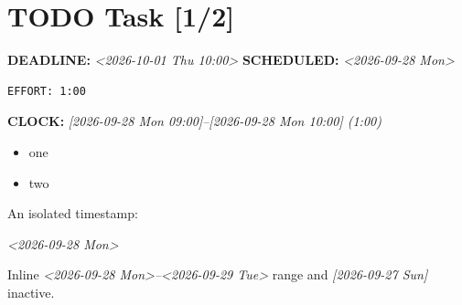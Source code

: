 \section{{\bfseries\sffamily TODO} Task [1/2]}
\label{sec:org1c59b52}
\noindent\textbf{DEADLINE:} \textit{<2026-10-01 Thu 10:00>} \textbf{SCHEDULED:} \textit{<2026-09-28 Mon> }\\
\begin{verbatim}
EFFORT: 1:00
\end{verbatim}
\noindent\textbf{CLOCK:} \textit{[2026-09-28 Mon 09:00]--[2026-09-28 Mon 10:00]  (1:00)}\\
\begin{itemize}
\item[{$\boxtimes$}] one
\item[{$\square$}] two
\end{itemize}

An isolated timestamp:

\textit{<2026-09-28 Mon>}

Inline \textit{<2026-09-28 Mon>--<2026-09-29 Tue> } range and \textit{{[}2026-09-27 Sun] } inactive.

